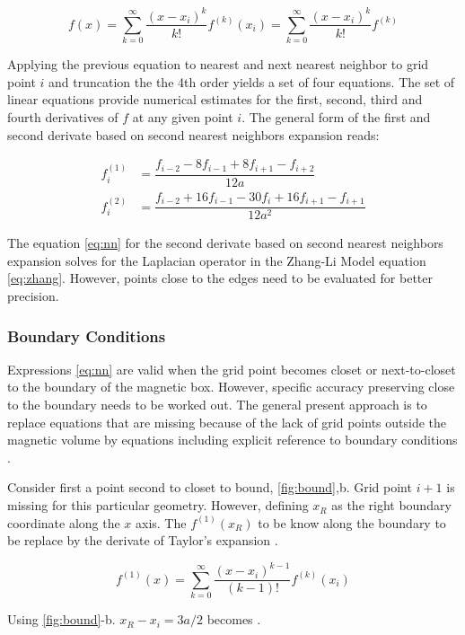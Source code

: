$$f(x) = \sum\limits_{k=0}^{\infty} \dfrac{(x-x_i)^k}{k!}f^{(k)}(x_i) = \sum\limits_{k=0}^{\infty} \dfrac{(x-x_i)^k}{k!}f^{(k)}$$

Applying the previous equation to nearest and next nearest neighbor to grid point $i$ and truncation the the 4th order yields a set of four equations. The set of linear equations provide numerical estimates for the first, second, third and fourth derivatives of $f$ at any given point $i$. The general form of the first and second derivate based on second nearest neighbors expansion reads:

\begin{align} \label{eq:nn}
f^{(1)}_i &= \dfrac{f_{i-2}-8f_{i-1} + 8f_{i+1} - f_{i+2}}{12a} \\
f^{(2)}_i &= \dfrac{f_{i-2}+16f_{i-1} -30f_{i} + 16f_{i+1} - f_{i+1}}{12a^2}
\end{align}

The equation \ref{eq:nn} for the second derivate based on second nearest neighbors expansion solves for the Laplacian operator in the Zhang-Li Model equation \ref{eq:zhang}. However, points close to the edges need to be evaluated for better precision. 

\subsubsection{Boundary Conditions}

Expressions \ref{eq:nn} are valid when the grid point becomes closet or next-to-closet to the boundary of the magnetic box. However, specific accuracy preserving close to the boundary needs to be worked out. The general present approach is to replace equations that are missing because of the lack of grid points outside the magnetic volume by equations including explicit reference to boundary conditions \cite{methods}.

Consider first a point second to closet to bound, \ref{fig:bound},b. Grid point $i + 1$ is missing for this particular geometry. However, defining $x_R$ as the right boundary coordinate along the $x$ axis. The $f^{(1)}(x_R)$ to be know along the boundary to be replace by the derivate of Taylor's expansion \cite{methods}.

\begin{equation} \label{eq:taylor}
f^{(1)}(x) = \sum\limits_{k=0}^{\infty} \dfrac{(x-x_i)^{k-1}}{(k - 1)!}f^{(k)}(x_i)
\end{equation}

Using \ref{fig:bound}-b. $x_R - x_i = 3a/2$ becomes \cite{methods}.

